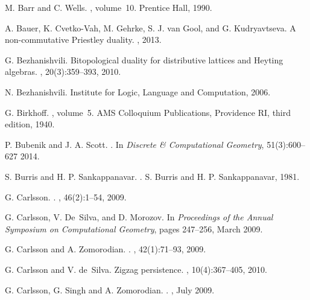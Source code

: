 \documentclass[10pt]{amsart}
\begin{document}
						


\begin{thebibliography}{10}

M. Barr and C. Wells.
, volume~10.
\newblock Prentice Hall, 1990.

A. Bauer, K. Cvetko-Vah, M. Gehrke, S. J. van Gool, and G. Kudryavtseva.
\newblock A non-commutative Priestley duality.
, 2013.

G. Bezhanishvili.
\newblock Bitopological duality for distributive lattices and Heyting algebras.
, 20(3):359--393,
  2010.

N. Bezhanishvili.
\newblock Institute for Logic, Language and Computation, 2006.

G. Birkhoff.
, volume~5.
\newblock AMS Colloquium Publications, Providence RI, third edition, 1940.

P. Bubenik and J. A. Scott.
.
\newblock In {\em Discrete \& Computational Geometry}, 51(3):600--627 2014.

S. Burris and H. P. Sankappanavar.
.
\newblock S. Burris and H. P. Sankappanavar, 1981.

G. Carlsson.
.
, 46(2):1--54, 2009.

G. Carlsson, V. De~Silva, and D. Morozov.
\newblock In {\em Proceedings of the Annual Symposium on Computational
  Geometry}, pages 247--256, March 2009.

G. Carlsson and A. Zomorodian.
.
, 42(1):71--93, 2009.

G. Carlsson and V. de~Silva.
\newblock Zigzag persistence.
, 10(4):367--405, 2010.

G. Carlsson, G. Singh and A. Zomorodian.
.
, July 2009.


\end{thebibliography}
\end{document}
